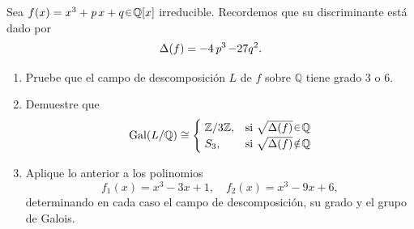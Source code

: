 \begin{ejer}
Sea $f(x) = x^3 + \p x + q \en \mathbb{Q}[x]$ irreducible. Recordemos que su discriminante está dado por
\[
\Delta(f) = -4\operatorname{\textit{p}}^3 - 27q^2.
\]

\begin{enumerate}[label=\alph*)]
\item Pruebe que el campo de descomposición $L$ de $f$ sobre $\mathbb{Q}$ tiene grado 3 o 6.

\item Demuestre que  
\[
\gal(L/\mathbb{Q}) \cong 
\begin{cases} 
\;\mathbb{Z}/3\mathbb{Z}, & \text{si } \sqrt{\Delta(f)} \en \mathbb{Q}\\ 
\;S_3,                    & \text{si } \sqrt{\Delta(f)} \noten \mathbb{Q}
\end{cases}
\]

\item Aplique lo anterior a los polinomios  
\[
f_1(x) = x^3 - 3x + 1, \quad f_2(x) = x^3 - 9x + 6,
\]
determinando en cada caso el campo de descomposición, su grado y el grupo de Galois.
\end{enumerate}
\end{ejer}
